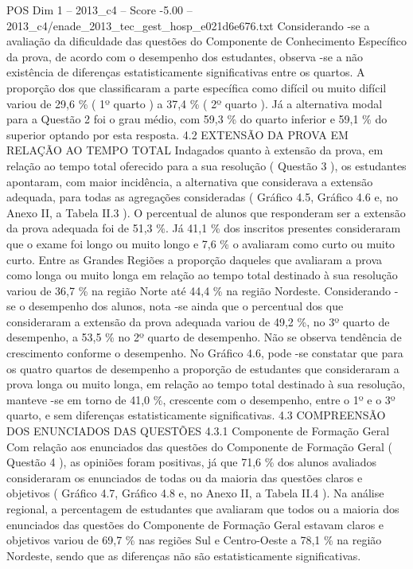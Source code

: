 \begin{textsample}{POS Dim 1 – 2013\_c4 – Score -5.00 – 2013\_c4/enade\_2013\_tec\_gest\_hosp\_e021d6e676.txt}
Considerando -se a avaliação da dificuldade das questões do Componente de Conhecimento Específico da prova, de acordo com o desempenho dos estudantes, observa -se a não existência de diferenças estatisticamente significativas entre os quartos.
A proporção dos que classificaram a parte específica como difícil ou muito difícil variou de 29,6 \% ( 1º quarto ) a 37,4 \% ( 2º quarto ).
Já a alternativa modal para a Questão 2 foi o grau médio, com 59,3 \% do quarto inferior e 59,1 \% do superior optando por esta resposta. 4.2 EXTENSÃO DA PROVA EM RELAÇÃO AO TEMPO TOTAL Indagados quanto à extensão da prova, em relação ao tempo total oferecido para a sua resolução ( Questão 3 ), os estudantes apontaram, com maior incidência, a alternativa que considerava a extensão adequada, para todas as agregações consideradas ( Gráfico 4.5, Gráfico 4.6 e, no Anexo II, a Tabela II.3 ).
O percentual de alunos que responderam ser a extensão da prova adequada foi de 51,3 \%.
Já 41,1 \% dos inscritos presentes consideraram que o exame foi longo ou muito longo e 7,6 \% o avaliaram como curto ou muito curto.
Entre as Grandes Regiões a proporção daqueles que avaliaram a prova como longa ou muito longa em relação ao tempo total destinado à sua resolução variou de 36,7 \% na região Norte até 44,4 \% na região Nordeste.
Considerando -se o desempenho dos alunos, nota -se ainda que o percentual dos que consideraram a extensão da prova adequada variou de 49,2 \%, no 3º quarto de desempenho, a 53,5 \% no 2º quarto de desempenho.
Não se observa tendência de crescimento conforme o desempenho.
No Gráfico 4.6, pode -se constatar que para os quatro quartos de desempenho a proporção de estudantes que consideraram a prova longa ou muito longa, em relação ao tempo total destinado à sua resolução, manteve -se em torno de 41,0 \%, crescente com o desempenho, entre o 1º e o 3º quarto, e sem diferenças estatisticamente significativas. 4.3 COMPREENSÃO DOS ENUNCIADOS DAS QUESTÕES 4.3.1 Componente de Formação Geral Com relação aos enunciados das questões do Componente de Formação Geral ( Questão 4 ), as opiniões foram positivas, já que 71,6 \% dos alunos avaliados consideraram os enunciados de todas ou da maioria das questões claros e objetivos ( Gráfico 4.7, Gráfico 4.8 e, no Anexo II, a Tabela II.4 ).
Na análise regional, a percentagem de estudantes que avaliaram que todos ou a maioria dos enunciados das questões do Componente de Formação Geral estavam claros e objetivos variou de 69,7 \% nas regiões Sul e Centro-Oeste a 78,1 \% na região Nordeste, sendo que as diferenças não são estatisticamente significativas.

\end{textsample}
